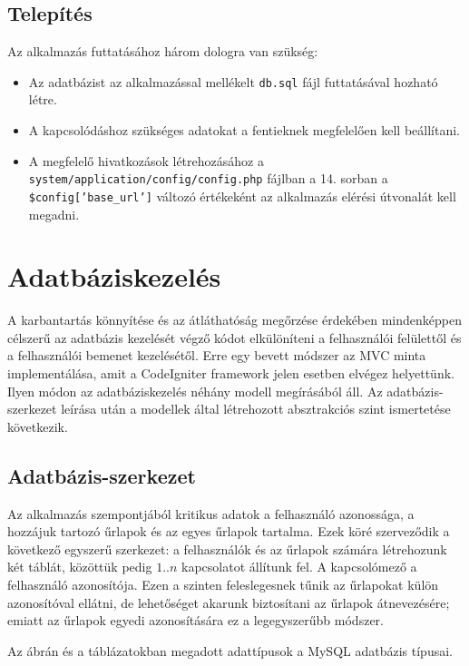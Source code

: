 \documentclass[12pt,a4paper,twoside]{article}
\begin{document}
\subsection{Telepítés}
Az alkalmazás futtatásához három dologra van szükség:

\begin{itemize}
\item Az adatbázist az alkalmazással mellékelt \texttt{db.sql} fájl futtatásával
  hozható létre.
\item A kapcsolódáshoz szükséges adatokat a fentieknek megfelelően
  kell beállítani.
\item A megfelelő hivatkozások létrehozásához a
  \texttt{system/application/config/config.php} fájlban a 14. sorban a
  \texttt{\$config['base\_url']} változó értékeként az alkalmazás elérési
  útvonalát kell megadni.
\end{itemize}

\section{Adatbáziskezelés}

A karbantartás könnyítése és az átláthatóság megőrzése érdekében mindenképpen
célszerű az adatbázis kezelését végző kódot elkülöníteni a felhasználói
felülettől és a felhasználói bemenet kezelésétől. Erre egy bevett módszer az
MVC\cite{MVC} minta implementálása, amit a CodeIgniter framework jelen esetben
elvégez helyettünk. Ilyen módon az adatbáziskezelés néhány modell megírásából
áll. Az adatbázis-szerkezet leírása után a modellek által létrehozott
absztrakciós szint ismertetése következik.

\subsection{Adatbázis-szerkezet}

Az alkalmazás szempontjából kritikus adatok a felhasználó azonossága, a hozzájuk
tartozó űrlapok és az egyes űrlapok tartalma. Ezek köré szerveződik a következő egyszerű
szerkezet: a felhasználók és az űrlapok számára létrehozunk két táblát, közöttük
pedig $1..n$ kapcsolatot állítunk fel. A kapcsolómező a felhasználó
azonosítója. Ezen a szinten feleslegesnek tűnik az űrlapokat külön
azonosítóval ellátni, de lehetőséget akarunk biztosítani az űrlapok
átnevezésére; emiatt az űrlapok egyedi azonosítására ez a legegyszerűbb módszer.

Az ábrán és a táblázatokban megadott adattípusok a MySQL adatbázis típusai.
\end{document}
